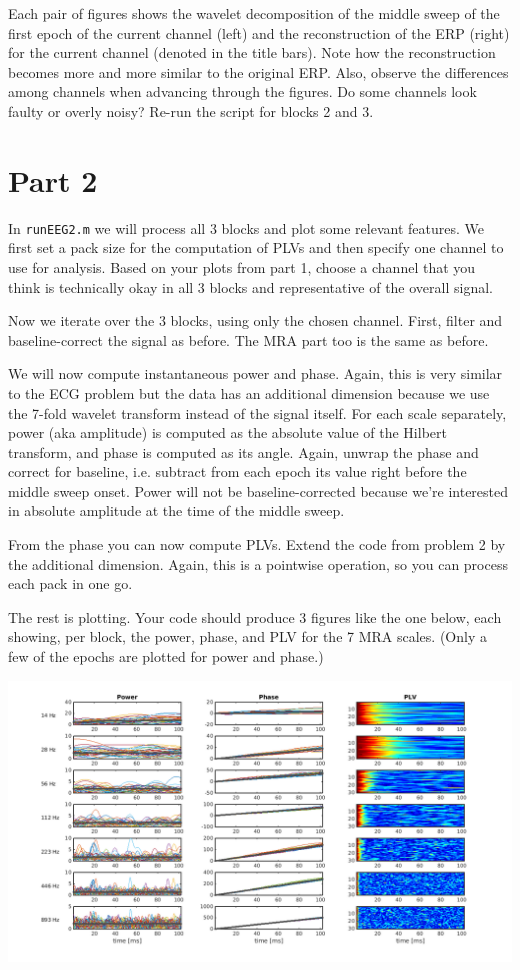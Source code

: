 \documentclass[10pt,a4paper,notitlepage]{report}
\begin{document}
Each pair of figures shows the wavelet decomposition of the middle sweep of the first epoch of the current channel (left) and the reconstruction of the ERP (right) for the current channel (denoted in the title bars). Note how the reconstruction becomes more and more similar to the original ERP. Also, observe the differences among channels when advancing through the figures. Do some channels look faulty or overly noisy? Re-run the script for blocks 2 and 3.

\section*{Part 2}
In \texttt{runEEG2.m} we will process all 3 blocks and plot some relevant features. We first set a pack size for the computation of PLVs and then specify one channel to use for analysis. Based on your plots from part 1, choose a channel that you think is technically okay in all 3 blocks and representative of the overall signal.

Now we iterate over the 3 blocks, using only the chosen channel. First, filter and baseline-correct the signal as before. The MRA part too is the same as before.

We will now compute instantaneous power and phase. Again, this is very similar to the ECG problem but the data has an additional dimension because we use the 7-fold wavelet transform instead of the signal itself. For each scale separately, power (aka amplitude) is computed as the absolute value of the Hilbert transform, and phase is computed as its angle. Again, unwrap the phase and correct for baseline, i.e. subtract from each epoch its value right before the middle sweep onset. Power will not be baseline-corrected because we're interested in absolute amplitude at the time of the middle sweep.

From the phase you can now compute PLVs. Extend the code from problem 2 by the additional dimension. Again, this is a pointwise operation, so you can process each pack in one go.

The rest is plotting. Your code should produce 3 figures like the one below, each showing, per block, the power, phase, and PLV for the 7 MRA scales. (Only a few of the epochs are plotted for power and phase.)

\vspace{1cm}
\hspace{-1cm} \includegraphics[scale=0.5]{p3fig4.png}
\vspace{5mm}
\end{document}
